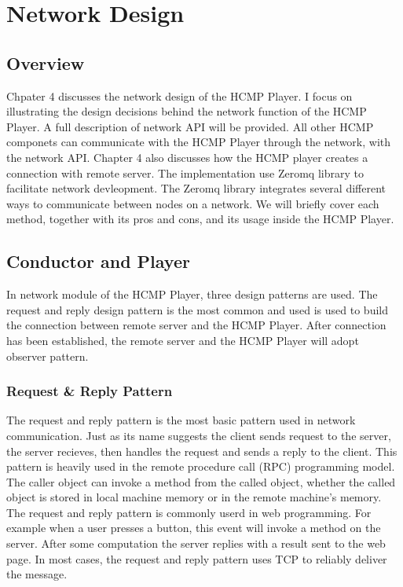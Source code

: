 
\chapter{Network Design}

\section{Overview}

Chpater 4 discusses the network design of the HCMP Player.  
I focus on illustrating the design decisions behind the network function of    
the HCMP Player. A full description of network API will be provided. All other
HCMP componets can communicate with the HCMP Player through the network,
with the network API. Chapter 4 also discusses how the HCMP player 
creates a connection with remote server. The implementation 
use Zeromq library to facilitate network devleopment. The Zeromq library 
integrates several different ways to communicate between nodes on a network.
We will briefly cover each method, together with its pros and cons, and 
its usage inside the HCMP Player.

\section{Conductor and Player}
In network module of the HCMP Player, three design patterns are used. The 
request and reply design pattern is the most common and used is used to 
build the connection between remote server
and the HCMP Player. After connection has been established, the remote server and
the HCMP Player will adopt observer pattern. 

\subsection{Request \& Reply Pattern}
The request and reply pattern is the most basic pattern used in network 
communication. Just as its name suggests the client sends request to the server,
the server recieves, then handles the request and sends a reply to
the client. This pattern is heavily used in the remote procedure call (RPC) 
programming model. The caller object can invoke a method from the called 
object, whether the called object is stored in local machine memory or
in the remote machine's memory. The request and reply pattern is commonly userd
in web programming. For example when a user presses a button, this event will 
invoke a method on the server. After some computation the server replies with 
a result sent to the web page. In most cases, the request and reply pattern
uses TCP to reliably deliver the message. 

